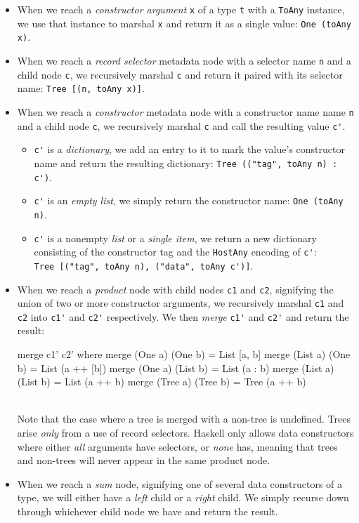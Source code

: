 \documentclass{sigplanconf}
\begin{document}
\begin{itemize}
\item
  When we reach a \emph{constructor argument} \lstinline!x! of a type
  \lstinline!t! with a \lstinline!ToAny! instance, we use that instance to
  marshal \lstinline!x! and return it as a single value:
  \lstinline!One (toAny x)!.
\item
  When we reach a \emph{record selector} metadata node with a selector
  name \lstinline!n! and a child node \lstinline!c!, we recursively marshal
  \lstinline!c! and return it paired with its selector name:
  \lstinline!Tree [(n, toAny x)]!.
\item
  When we reach a \emph{constructor} metadata node with a constructor name
  name \lstinline!n! and a child node \lstinline!c!, we recursively marshal
  \lstinline!c! and call the resulting value \lstinline!c'!.
  \begin{itemize}
  \item
    \lstinline!c'! is a \emph{dictionary}, we add an entry to it to mark the
    value's constructor name and return the resulting dictionary:
    \lstinline!Tree (("tag", toAny n) : c')!.
  \item
    \lstinline!c'! is an \emph{empty list}, we simply return the constructor
    name:
    \lstinline!One (toAny n)!.
  \item
    \lstinline!c'! is a nonempty \emph{list} or a \emph{single item},
    we return a new dictionary consisting of the constructor tag and the
    \lstinline!HostAny! encoding of \lstinline!c'!:\\
    \lstinline!Tree [("tag", toAny n), ("data", toAny c')]!.
  \end{itemize}
\item
  When we reach a \emph{product} node with child nodes \lstinline!c1! and
  \lstinline!c2!, signifying the union of two or more constructor arguments,
  we recursively marshal \lstinline!c1! and \lstinline!c2! into
  \lstinline!c1'! and \lstinline!c2'! respectively. We then \emph{merge}
  \lstinline!c1'! and \lstinline!c2'! and return the result:
  \begin{code}
    merge c1' c2'
      where
        merge (One a) (One b)   = List [a, b]
        merge (List a) (One b)  = List (a ++ [b])
        merge (One a) (List b)  = List (a : b)
        merge (List a) (List b) = List (a ++ b)
        merge (Tree a) (Tree b) = Tree (a ++ b)
  \end{code}\\
  Note that the case where a tree is merged with a non-tree is undefined.
  Trees arise \emph{only} from a use of record selectors. Haskell only
  allows data constructors where either \emph{all} arguments have selectors,
  or \emph{none} has, meaning that trees and non-trees will never appear in
  the same product node.
\item
  When we reach a \emph{sum} node, signifying one of several data constructors
  of a type, we will either have a \emph{left} child or a \emph{right} child.
  We simply recurse down through whichever child node we have and return the
  result.
\end{itemize}
\end{document}
